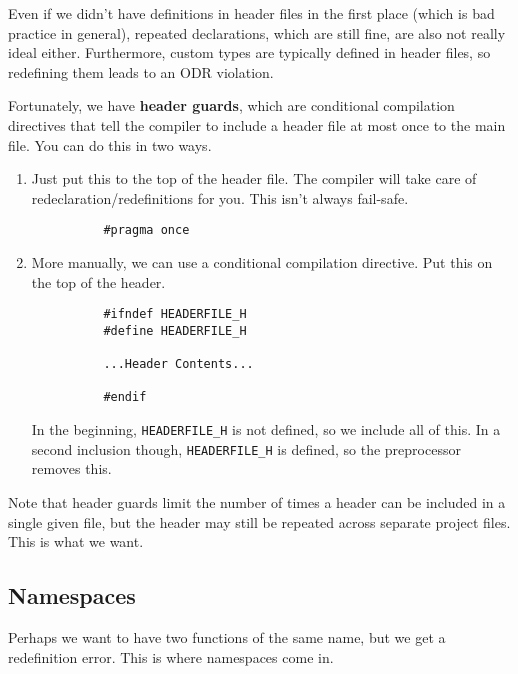\documentclass{article}
\begin{document}
    Even if we didn't have definitions in header files in the first place (which is bad practice in general), repeated declarations, which are still fine, are also not really ideal either. Furthermore, custom types are typically defined in header files, so redefining them leads to an ODR violation. 
    
    \begin{definition}
      Fortunately, we have \textbf{header guards}, which are conditional compilation directives that tell the compiler to include a header file at most once to the main file. You can do this in two ways. 
      \begin{enumerate}
        \item Just put this to the top of the header file. The compiler will take care of redeclaration/redefinitions for you. This isn't always fail-safe. 
        \begin{lstlisting}
          #pragma once
        \end{lstlisting} 

      \item More manually, we can use a conditional compilation directive. Put this on the top of the header. 
        \begin{lstlisting}
          #ifndef HEADERFILE_H
          #define HEADERFILE_H 
          
          ...Header Contents...

          #endif 
        \end{lstlisting}
        In the beginning, \texttt{HEADERFILE\_H} is not defined, so we include all of this. In a second inclusion though, \texttt{HEADERFILE\_H} is defined, so the preprocessor removes this. 
      \end{enumerate}

      Note that header guards limit the number of times a header can be included in a single given file, but the header may still be repeated across separate project files. This is what we want. 
    \end{definition}

  \subsection{Namespaces} 

    Perhaps we want to have two functions of the same name, but we get a redefinition error. This is where namespaces come in. 
\end{document}
